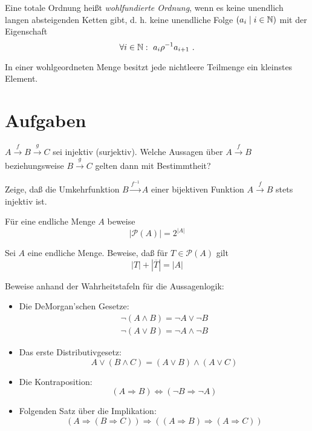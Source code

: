 \begin{definition}
  Eine totale Ordnung heißt \textit{wohlfundierte
    Ordnung}, wenn es keine unendlich langen
  absteigenden Ketten gibt, d. h. keine unendliche Folge $(a_i\mid i\in\mathbb{N})$
  mit der Eigenschaft
  \[\forall i\in\enn:\ a_i\rho^{-1}a_{i+1}\ .\]
\end{definition}
In einer wohlgeordneten Menge besitzt jede
  nichtleere Teilmenge ein kleinstes Element.

\section*{Aufgaben}
\begin{aufgabe}
 $A \stackrel{f}{\rightarrow}B\stackrel{g}{\rightarrow}C$ sei injektiv
   (surjektiv). Welche Aussagen über $A\stackrel{f}{\rightarrow}B$ beziehungsweise 
   $B\stackrel{g}{\rightarrow}C$ gelten dann mit Bestimmtheit?
\end{aufgabe}

\begin{aufgabe} 
   Zeige, daß die Umkehrfunktion $B \stackrel{f^{-1}}{\longrightarrow}
   A$ einer bijektiven Funktion $A \stackrel{f}{\rightarrow} B$ stets
   injektiv ist.
\end{aufgabe}

\begin{aufgabe}
        Für eine endliche Menge $A$ beweise
        \[|\mathcal{P}(A)| = 2^{|A|}\]
\end{aufgabe}

\begin{aufgabe}
        Sei $A$ eine endliche Menge. Beweise, daß für $T\in\mathcal{P}(A)$
        gilt
\[|T| + |\overline T| = |A|\]
\end{aufgabe}

\begin{aufgabe}
  Beweise anhand der Wahrheitstafeln für die Aussagenlogik:
  \begin{itemize}
  \item Die DeMorgan'schen Gesetze:
    \begin{eqnarray*}
      \neg(A\wedge B) = \neg A \vee \neg B\\
      \neg(A\vee B) = \neg A \wedge \neg B
    \end{eqnarray*}
  \item Das erste Distributivgesetz:
    \begin{displaymath}
      A\vee(B\wedge C) = (A\vee B)\wedge (A\vee C)
    \end{displaymath}
  \item Die Kontraposition:
    \begin{displaymath}
      (A\Rightarrow B) \Leftrightarrow (\neg B\Rightarrow \neg A)
    \end{displaymath}
  \item Folgenden Satz über die Implikation:
    \begin{displaymath}
    (A\Rightarrow (B\Rightarrow C))\Rightarrow((A\Rightarrow
      B)\Rightarrow (A\Rightarrow C))
    \end{displaymath}
  \end{itemize}
\end{aufgabe}

